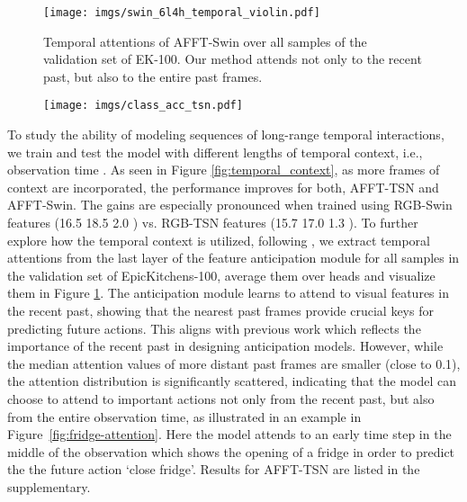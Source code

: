 \documentclass[10pt,twocolumn,letterpaper,dvipsnames]{article}
\newcommand{\sname}{AFFT}
\begin{document}
\begin{figure}[t]
    \centering
    \texttt{[image: imgs/swin\_6l4h\_temporal\_violin.pdf]}
    \caption{Temporal attentions of \sname-Swin over all samples of the validation set of EK-100. Our method attends not only to the recent past, but also to the entire past frames.}
    \label{fig:temporal_attention_swin}
\end{figure}
\begin{figure*}[t]
    \centering
    \begin{subfigure}{\linewidth}
        \texttt{[image: imgs/class\_acc\_tsn.pdf]}
    \end{subfigure}
    \vspace{-0.6cm}
    \caption{Per-class top-5 accuracy of fusion (\sname-TSN) and single modalities for the largest 25 actions in the validation set of EpicKitchens-100. The classes are presented in the order of number of samples per class, from left to right. For most classes the fusion method provides significantly better results over the single modalities.}
    \label{fig:class_acc_tsn}
\end{figure*}
To study the ability of modeling sequences of long-range temporal interactions, we train and test the model with different lengths of temporal context, i.e., observation time . As seen in Figure \ref{fig:temporal_context}, as more frames of context are incorporated, the performance improves for both, \sname-TSN and \sname-Swin. The gains are especially pronounced when trained using RGB-Swin features (16.5  18.5  2.0 ) vs. RGB-TSN features (15.7  17.0  1.3 ). To further explore how the temporal context is utilized, following \cite{girdharAnticipativeVideoTransformer2021}, we extract temporal attentions from the last layer of the feature anticipation module for all samples in the validation set of EpicKitchens-100, average them over heads and visualize them in Figure \ref{fig:temporal_attention_swin}. The anticipation module learns to attend to visual features in the recent past, showing that the nearest past frames provide crucial keys for predicting future actions. This aligns with previous work \cite{keTimeConditionedActionAnticipation2019,senerTemporalAggregateRepresentations2020} which reflects the importance of the recent past in designing anticipation models. However, while the median attention values of more distant past frames are smaller (close to 0.1), the attention distribution is significantly scattered, indicating that the model can choose to attend to important actions not only from the recent past, but also from the entire observation time, as illustrated in an example in Figure~\ref{fig:fridge-attention}. Here the model attends to an early time step in the middle of the observation which shows the opening of a fridge in order to predict the the future action `close fridge'. Results for \sname-TSN are listed in the supplementary.
\end{document}
